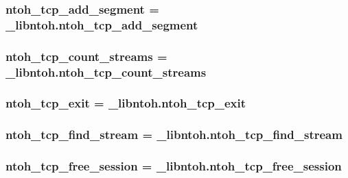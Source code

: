 \hypertarget{namespacelibntoh_a419c097d453b148c874967b7fbc8bbdd}{
\subsubsection[{ntoh\-\_\-tcp\-\_\-add\-\_\-segment}]{\setlength{\rightskip}{0pt plus 5cm}ntoh\-\_\-tcp\-\_\-add\-\_\-segment = \-\_\-libntoh.\-ntoh\-\_\-tcp\-\_\-add\-\_\-segment}}\label{namespacelibntoh_a419c097d453b148c874967b7fbc8bbdd}
\hypertarget{namespacelibntoh_ab3d839526fe3363ddc246b4c4c08cd40}{
\subsubsection[{ntoh\-\_\-tcp\-\_\-count\-\_\-streams}]{\setlength{\rightskip}{0pt plus 5cm}ntoh\-\_\-tcp\-\_\-count\-\_\-streams = \-\_\-libntoh.\-ntoh\-\_\-tcp\-\_\-count\-\_\-streams}}\label{namespacelibntoh_ab3d839526fe3363ddc246b4c4c08cd40}
\hypertarget{namespacelibntoh_a340fd8622da67843a00646b5602a9277}{
\subsubsection[{ntoh\-\_\-tcp\-\_\-exit}]{\setlength{\rightskip}{0pt plus 5cm}ntoh\-\_\-tcp\-\_\-exit = \-\_\-libntoh.\-ntoh\-\_\-tcp\-\_\-exit}}\label{namespacelibntoh_a340fd8622da67843a00646b5602a9277}
\hypertarget{namespacelibntoh_ab534ac1a739dc7c414e5543ce689d90e}{
\subsubsection[{ntoh\-\_\-tcp\-\_\-find\-\_\-stream}]{\setlength{\rightskip}{0pt plus 5cm}ntoh\-\_\-tcp\-\_\-find\-\_\-stream = \-\_\-libntoh.\-ntoh\-\_\-tcp\-\_\-find\-\_\-stream}}\label{namespacelibntoh_ab534ac1a739dc7c414e5543ce689d90e}
\hypertarget{namespacelibntoh_a623e317826b44c1ccff0aa6dfd92b7e3}{
\subsubsection[{ntoh\-\_\-tcp\-\_\-free\-\_\-session}]{\setlength{\rightskip}{0pt plus 5cm}ntoh\-\_\-tcp\-\_\-free\-\_\-session = \-\_\-libntoh.\-ntoh\-\_\-tcp\-\_\-free\-\_\-session}}\label{namespacelibntoh_a623e317826b44c1ccff0aa6dfd92b7e3}
